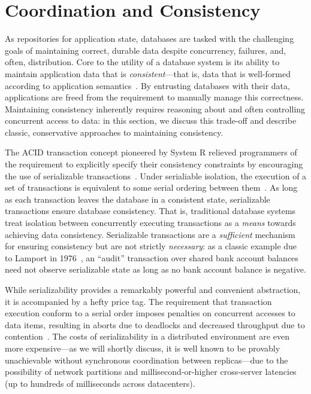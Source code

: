 
\section{Coordination and Consistency}
\label{sec:motivation}


As repositories for application state, databases are tasked with the
challenging goals of maintaining correct, durable data despite
concurrency, failures, and, often, distribution. Core to the utility
of a database system is its ability to maintain application data that
is \textit{consistent}---that is, data that is well-formed according
to application semantics~\cite{gray-virtues}. By entrusting databases
with their data, applications are freed from the requirement to
manually manage this correctness. Maintaining consistency inherently
requires reasoning about and often controlling concurrent access to
data: in this section, we discuss this trade-off and describe classic,
conservative approaches to maintaining consistency.


 The ACID transaction concept
pioneered by System R relieved programmers of the requirement to
explicitly specify their consistency constraints by encouraging the
use of serializable transactions~\cite{gray-virtues}. Under
serialiable isolation, the execution of a set of transactions is
equivalent to some serial ordering between
them~\cite{bernstein-book}. As long as each transaction leaves the
database in a consistent state, serializable transactions ensure
database consistency. That is, traditional database systems treat
isolation between concurrently executing transactions as a
\textit{means} towards achieving data consistency. Serializable
transactions are a \textit{sufficient} mechanism for ensuring
consistency but are not strictly \textit{necessary}: as a classic
example due to Lamport in 1976~\cite{lamport-audit}, an ``audit''
transaction over shared bank account balances need not observe
serializable state as long as no bank account balance is negative.


While serializability provides a remarkably powerful and convenient
abstraction, it is accompanied by a hefty price tag. The requirement
that transaction execution conform to a serial order imposes penalties
on concurrent accesses to data items, resulting in aborts due to
deadlocks and decreased throughput due to
contention~\cite{bernstein-book,gray-virtues}. The costs of
serializability in a distributed environment are even more
expensive---as we will shortly discuss, it is well known to be
provably unachievable without synchronous coordination between
replicas---due to the possibility of network partitions and
millisecond-or-higher cross-server latencies (up to hundreds of
milliseconds across datacenters).

